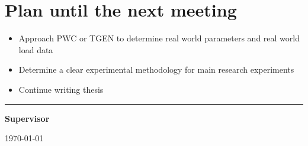 \documentclass[12pt]{article}
\begin{document}
	\section{Plan until the next meeting}
	\begin{itemize}
		\item Approach PWC or TGEN to determine real world parameters and real world load data
		\item Determine a clear experimental methodology for main research experiments
		\item Continue writing thesis
	\end{itemize}
	\par
	\vspace{\fill}%
	\noindent\rule{0.4\linewidth}{0.5pt}%
	\vspace{1em}%
	\par
	\noindent\textbf{Supervisor}\vspace{1em}%
	\par
	\noindent\today
\end{document}
